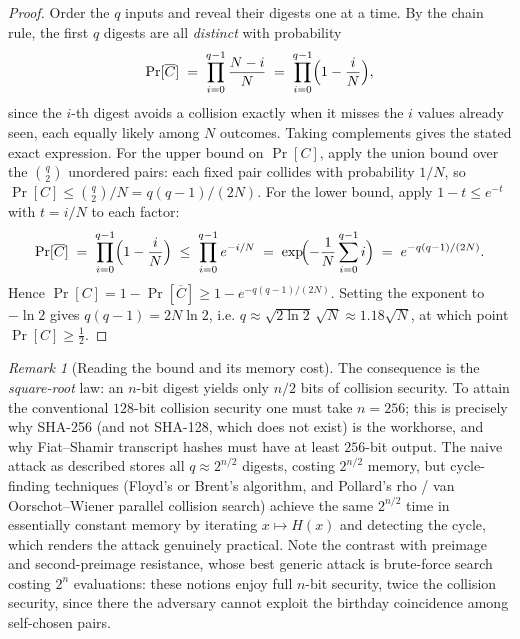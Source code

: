 \documentclass[11pt,a4paper]{article}
\theoremstyle{definition}
\theoremstyle{remark}
\newtheorem{remark}[theorem]{Remark}
\begin{document}
\begin{proof}
Order the \(q\) inputs and reveal their digests one at a time. By the chain rule, the first \(q\) digests are all \emph{distinct} with probability
\[
  \Pr[\overline{C}]
  \;=\;
  \prod_{i=0}^{q-1}\frac{N-i}{N}
  \;=\;
  \prod_{i=0}^{q-1}\Bigl(1 - \frac{i}{N}\Bigr),
\]
since the \(i\)-th digest avoids a collision exactly when it misses the \(i\) values already seen, each equally likely among \(N\) outcomes. Taking complements gives the stated exact expression. For the upper bound on \(\Pr[C]\), apply the union bound over the \(\binom{q}{2}\) unordered pairs: each fixed pair collides with probability \(1/N\), so \(\Pr[C] \leq \binom{q}{2}/N = q(q-1)/(2N)\). For the lower bound, apply \(1 - t \leq e^{-t}\) with \(t = i/N\) to each factor:
\[
  \Pr[\overline{C}]
  \;=\;
  \prod_{i=0}^{q-1}\Bigl(1 - \frac{i}{N}\Bigr)
  \;\leq\;
  \prod_{i=0}^{q-1} e^{-i/N}
  \;=\;
  \exp\!\Bigl(-\frac{1}{N}\sum_{i=0}^{q-1} i\Bigr)
  \;=\;
  e^{-q(q-1)/(2N)}.
\]
Hence \(\Pr[C] = 1 - \Pr[\overline{C}] \geq 1 - e^{-q(q-1)/(2N)}\). Setting the exponent to \(-\ln 2\) gives \(q(q-1) = 2N\ln 2\), i.e. \(q \approx \sqrt{2\ln 2}\,\sqrt{N} \approx 1.18\sqrt{N}\), at which point \(\Pr[C] \geq \tfrac12\).
\end{proof}

\begin{remark}[Reading the bound and its memory cost]\label{hash:rem:birthdayread}
The consequence is the \emph{square-root} law: an \(n\)-bit digest yields only \(n/2\) bits of collision security. To attain the conventional \(128\)-bit collision security one must take \(n = 256\); this is precisely why SHA-256 (and not SHA-128, which does not exist) is the workhorse, and why Fiat--Shamir transcript hashes must have at least \(256\)-bit output. The naive attack as described stores all \(q \approx 2^{n/2}\) digests, costing \(2^{n/2}\) memory, but cycle-finding techniques (Floyd's or Brent's algorithm, and Pollard's rho / van Oorschot--Wiener parallel collision search) achieve the same \(2^{n/2}\) time in essentially constant memory by iterating \(x \mapsto H(x)\) and detecting the cycle, which renders the attack genuinely practical. Note the contrast with preimage and second-preimage resistance, whose best generic attack is brute-force search costing \(2^{n}\) evaluations: these notions enjoy full \(n\)-bit security, twice the collision security, since there the adversary cannot exploit the birthday coincidence among self-chosen pairs.
\end{remark}
\end{document}
